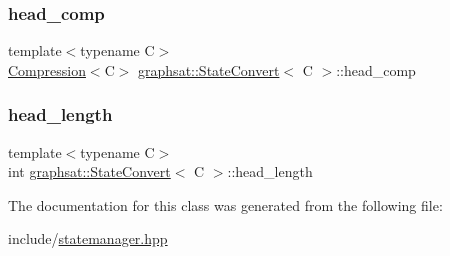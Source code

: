 \mbox{\label{classgraphsat_1_1_state_convert_a95cd073445c5508b92a64d7f506e8ef3}} 
\subsubsection{\texorpdfstring{head\_comp}{head\_comp}}
{\footnotesize\ttfamily template$<$typename C$>$ \\
\mbox{\hyperlink{classgraphsat_1_1_compression}{Compression}}$<$C$>$ \mbox{\hyperlink{classgraphsat_1_1_state_convert}{graphsat\+::\+State\+Convert}}$<$ C $>$\+::head\+\_\+comp\hspace{0.3cm}{\ttfamily [private]}}

\mbox{\label{classgraphsat_1_1_state_convert_a1d5bd9e862cf4706b233d19b1f2ec177}} 
\subsubsection{\texorpdfstring{head\_length}{head\_length}}
{\footnotesize\ttfamily template$<$typename C$>$ \\
int \mbox{\hyperlink{classgraphsat_1_1_state_convert}{graphsat\+::\+State\+Convert}}$<$ C $>$\+::head\+\_\+length\hspace{0.3cm}{\ttfamily [private]}}



The documentation for this class was generated from the following file\+:\begin{DoxyCompactItemize}
\item 
include/\mbox{\hyperlink{statemanager_8hpp}{statemanager.\+hpp}}\end{DoxyCompactItemize}
